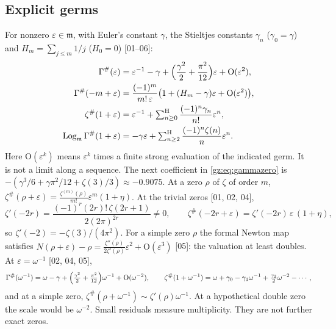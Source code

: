 \documentclass[11pt,a4paper]{article}
\numberwithin{equation}{section}
\theoremstyle{definition}
\theoremstyle{remark}
\newcommand{\mm}{\mathfrak m}
\newcommand{\eps}{\varepsilon}
\newcommand{\Lgm}{\operatorname{Log}_{\mm}}
\newcommand{\Sh}{\mathop{\textstyle\sum}\nolimits^{\mathrm H}}
\newcommand{\Gp}{\Gamma^{\#}}
\newcommand{\zp}{\zeta^{\#}}
\newcommand{\src}[1]{\textup{[#1]}}
\newcommand{\bigO}{\mathrm{O}}
\begin{document}
\subsection{Explicit germs}\label{gz:sec:germs}
For nonzero $\eps\in\mm$, with Euler's constant $\gamma$, the Stieltjes
constants $\gamma_n$ ($\gamma_0=\gamma$) and $H_m=\sum_{j\le m}1/j$
($H_0=0$) \src{01--06}:
\begin{align}
\Gp(\eps)&=\eps^{-1}-\gamma+\Bigl(\frac{\gamma^2}2+\frac{\pi^2}{12}\Bigr)\eps+\bigO(\eps^2),\label{gz:eq:gammazero}\\
\Gp(-m+\eps)&=\frac{(-1)^m}{m!\,\eps}\bigl(1+(H_m-\gamma)\eps+\bigO(\eps^2)\bigr),\label{gz:eq:gammapole}\\
\zp(1+\eps)&=\eps^{-1}+\Sh_{n\ge0}\frac{(-1)^n\gamma_n}{n!}\eps^n,\label{gz:eq:zetapole}\\
\Lgm\Gp(1+\eps)&=-\gamma\eps+\Sh_{n\ge2}\frac{(-1)^n\zeta(n)}n\eps^n .\label{gz:eq:loggamma}
\end{align}
Here $\bigO(\eps^k)$ means $\eps^k$ times a finite strong evaluation of the
indicated germ. It is not a limit along a sequence. The next coefficient in
\eqref{gz:eq:gammazero} is $-(\gamma^3/6+\gamma\pi^2/12+\zeta(3)/3)\approx-0.9075$.
At a zero $\rho$ of $\zeta$ of order $m$,
$\zp(\rho+\eps)=\frac{\zeta^{(m)}(\rho)}{m!}\eps^m(1+\eta)$. At the trivial
zeros \src{01, 02, 04},
\begin{equation}\label{gz:eq:trivialslope}
\zeta'(-2r)=\frac{(-1)^r(2r)!\,\zeta(2r+1)}{2(2\pi)^{2r}}\ne0,\qquad
\zp(-2r+\eps)=\zeta'(-2r)\,\eps\,(1+\eta),
\end{equation}
so $\zeta'(-2)=-\zeta(3)/(4\pi^2)$. For a simple zero $\rho$ the formal
Newton map satisfies
$N(\rho+\eps)-\rho=\frac{\zeta''(\rho)}{2\zeta'(\rho)}\eps^2+\bigO(\eps^3)$
\src{05}: the valuation at least doubles. At $\eps=\omega^{-1}$
\src{02, 04, 05},
\[
\Gp(\omega^{-1})=\omega-\gamma+\Bigl(\tfrac{\gamma^2}2+\tfrac{\pi^2}{12}\Bigr)\omega^{-1}+\bigO(\omega^{-2}),\qquad
\zp(1+\omega^{-1})=\omega+\gamma_0-\gamma_1\omega^{-1}+\tfrac{\gamma_2}2\omega^{-2}-\cdots,
\]
and at a simple zero, $\zp(\rho+\omega^{-1})\sim\zeta'(\rho)\omega^{-1}$.
At a hypothetical double zero the scale would be $\omega^{-2}$. Small
residuals measure multiplicity. They are not further exact zeros.
\end{document}
